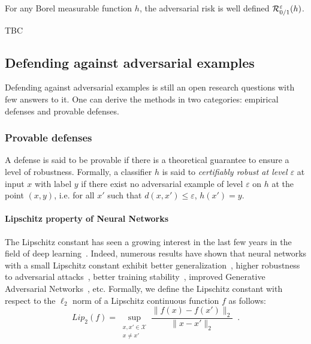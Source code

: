 \begin{prop}
For any  Borel measurable function $h$, the adversarial risk is well defined $\mathcal{R}^\varepsilon_{0/1}(h)$.
\end{prop}
TBC





\subsection{Defending against adversarial examples}

Defending against adversarial examples is still an open research questions with few answers to it. One can derive the methods in two categories: empirical defenses and provable defenses.

\subsubsection{Provable defenses}
A defense is said to be provable if there is a theoretical guarantee to ensure a level of robustness. Formally, a classifier $h$ is said to \emph{certifiably robust at level $\varepsilon$} at input $x$ with label $y$ if there exist no adversarial example of level $\varepsilon$ on $h$ at the point $(x,y)$, i.e. for all $x'$ such that $d(x,x')\leq\varepsilon$, $h(x') = y$. 

\paragraph{Lipschitz property of Neural Networks} 
The Lipschitz constant has seen a growing interest in the last few years in the field of deep learning~\citep{scaman2018lipschitz,fazlyab2019efficient,combettes2020lipschitz,bethune2021many}.
Indeed, numerous results have shown that neural networks with a small Lipschitz constant exhibit better generalization~\citep{bartlett2017spectrally}, higher robustness to adversarial attacks~\citep{szegedy2014intriguing,farnia2018generalizable,tsuzuku2018lipschitz}, better training stability~\citep{xiao2018dynamical,trockman2021orthogonalizing}, improved Generative Adversarial Networks~\citep{arjovsky2017wasserstein}, etc.
Formally, we define the Lipschitz constant with respect to the $\ell_2$ norm of a Lipschitz continuous function $f$ as follows:
\begin{equation*}
  Lip_{2}{(f)} = \sup_{\substack{x, x' \in \mathcal{X} \\ x \neq x'}} \frac{\lVert f(x) - f(x') \rVert_2}{\lVert x - x' \rVert_2} \enspace.
\end{equation*}

